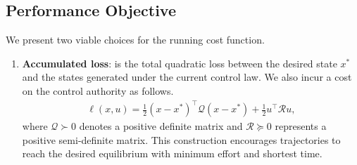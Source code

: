 \subsection{Performance Objective}
\label{ssec:performance_objective}
%
We present two viable choices for the running cost function. 
\begin{enumerate}
    \item \textbf{Accumulated loss}: is the total quadratic loss between the desired
    state $x^*$ and the states generated under the current control law. We also
    incur a cost on the control authority as follows.
    \begin{equation}
        \begin{gathered}
            \ell(x, u) = \frac{1}{2}(x - x^*)^\top \mathcal{Q} (x - x^*) + \frac{1}{2} u^\top \mathcal{R} u , 
        \end{gathered}
    \label{eq:accumulatedLoss}
    \end{equation}
    \noindent where $\mathcal{Q} \succ 0$ denotes a positive definite matrix and
    $\mathcal{R} \succeq 0$ represents a positive semi-definite matrix.
    This construction encourages trajectories to reach the desired equilibrium
    with minimum effort and shortest time.


\end{enumerate}
